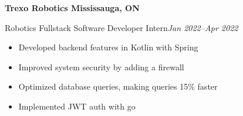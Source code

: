 \textbf{Trexo Robotics \hfill Mississauga, ON}

Robotics Fullstack Software Developer Intern\hfill \textit{Jan 2022--Apr 2022}
\begin{itemize}
    \item Developed backend features in Kotlin with Spring
    \item Improved system security by adding a firewall
    \item Optimized database queries, making queries 15\% faster
    \item Implemented JWT auth with go
\end{itemize}
